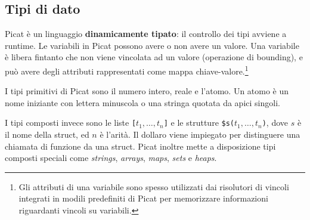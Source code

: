 \documentclass[12pt,a4paper,openright]{book} %
\begin{document}
\subsection{Tipi di dato}
\label{subsec:picat_base_datatype}

Picat è un linguaggio \textbf{dinamicamente tipato}: il controllo dei
tipi avviene a runtime. Le variabili in Picat possono avere o non
avere un valore. Una variabile è libera fintanto che non viene
vincolata ad un valore (operazione di bounding), e può avere degli
attributi rappresentati come mappa chiave-valore.\footnote{Gli
  attributi di una variabile sono spesso utilizzati dai risolutori di
  vincoli integrati in modili predefiniti di Picat per memorizzare
  informazioni riguardanti vincoli su variabili.}

I tipi primitivi di Picat sono il numero intero, reale e l'atomo. Un
atomo è un nome iniziante con lettera minuscola o una stringa quotata
da apici singoli.

I tipi composti invece sono le liste \verb|[|$t_1, \ldots,
t_n$\verb|]| e le strutture \verb|$s(|$t_1, \ldots, t_n$\verb|)|, dove
$s$ è il nome della struct, ed $n$ è l'arità. Il dollaro viene
impiegato per distinguere una chiamata di funzione da una
struct. Picat inoltre mette a disposizione tipi composti speciali come
\emph{strings}, \emph{arrays}, \emph{maps}, \emph{sets} e
\emph{heaps}.
\end{document}
